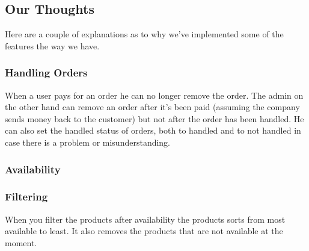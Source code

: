 \subsection{Our Thoughts}

Here are a couple of explanations as to why we've implemented some of the features the way we have.

\subsubsection{Handling Orders}

When a user pays for an order he can no longer remove the order. The admin on the other hand can remove an order after it's been paid (assuming the company sends money back to the customer) but not after the order has been handled. He can also set the handled status of orders, both to handled and to not handled in case there is a problem or misunderstanding.

\subsubsection{Availability}

\subsubsection{Filtering}

When you filter the products after availability the products sorts from most available to least. It also removes the products that are not available at the moment.